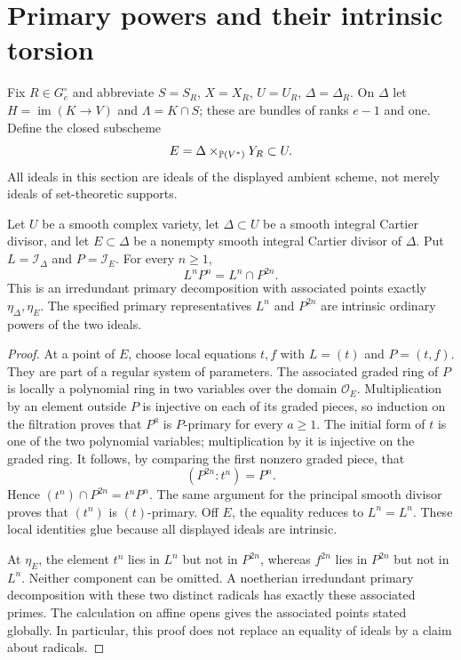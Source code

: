 \section{Primary powers and their intrinsic torsion}
\label{sec:intrinsic-primary-powers}
Fix $R\in G_e^\circ$ and abbreviate $S=S_R$, $X=X_R$,
$U=U_R$, $\Delta=\Delta_R$. On $\Delta$ let
$H=\operatorname{im}(K\to V)$ and $\Lambda=K\cap S$; these are
bundles of ranks $e-1$ and one. Define the closed subscheme
\begin{equation}\label{eq:ramification-embedded-support}
 E=\Delta\times_{\mathbb P(V^*)}Y_R\subset U.
\end{equation}
All ideals in this section are ideals of the displayed ambient scheme,
not merely ideals of set-theoretic supports.

\begin{lemma}
\label{lem:global-two-stratum}
Let $U$ be a smooth complex variety, let $\Delta\subset U$ be a
smooth integral Cartier divisor, and let $E\subset\Delta$ be a
nonempty smooth integral Cartier divisor of $\Delta$. Put
$L=\mathcal I_\Delta$ and $P=\mathcal I_E$. For every $n\ge1$,
\begin{equation}\label{eq:global-two-stratum}
 L^nP^n=L^n\cap P^{2n}.
\end{equation}
This is an irredundant primary decomposition with associated points
exactly $\eta_\Delta,\eta_E$. The specified primary representatives
$L^n$ and $P^{2n}$ are intrinsic ordinary powers of the two ideals.
\end{lemma}
\begin{proof}
At a point of $E$, choose local equations $t,f$ with
$L=(t)$ and $P=(t,f)$. They are part of a regular system of
parameters. The associated graded ring of $P$ is locally a
polynomial ring in two variables over the domain $\mathcal O_E$.
Multiplication by an element outside $P$ is injective on each of
its graded pieces, so induction on the filtration proves that
$P^a$ is $P$-primary for every $a\ge1$. The initial form of $t$
is one of the two polynomial variables; multiplication by it is
injective on the graded ring. It follows, by comparing the first
nonzero graded piece, that
\[
 (P^{2n}:t^n)=P^n.
\]
Hence $(t^n)\cap P^{2n}=t^nP^n$. The same argument for the
principal smooth divisor proves that $(t^n)$ is $(t)$-primary.
Off $E$, the equality reduces to $L^n=L^n$. These local identities
glue because all displayed ideals are intrinsic.

At $\eta_E$, the element $t^n$ lies in $L^n$ but not in $P^{2n}$,
whereas $f^{2n}$ lies in $P^{2n}$ but not in $L^n$. Neither
component can be omitted. A noetherian irredundant primary
decomposition with these two distinct radicals has exactly these
associated primes. The calculation on affine opens gives the
associated points stated globally. In particular, this proof does
not replace an equality of ideals by a claim about radicals.
\end{proof}

